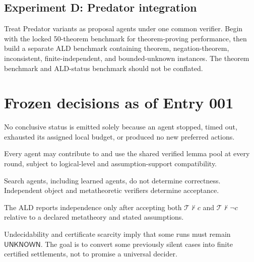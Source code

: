 \documentclass[11pt]{article}
\theoremstyle{definition}
\theoremstyle{remark}
\newcommand{\T}{\mathcal T}
\newcommand{\Unknown}{\mathsf{UNKNOWN}}
\begin{document}
\subsection{Experiment D: Predator integration}
Treat Predator variants as proposal agents under one common verifier. Begin with the locked 50-theorem benchmark for theorem-proving performance, then build a separate ALD benchmark containing theorem, negation-theorem, inconsistent, finite-independent, and bounded-unknown instances. The theorem benchmark and ALD-status benchmark should not be conflated.

\section{Frozen decisions as of Entry 001}

\begin{decisionbox}
No conclusive status is emitted solely because an agent stopped, timed out, exhausted its assigned local budget, or produced no new preferred actions.
\end{decisionbox}

\begin{decisionbox}
Every agent may contribute to and use the shared verified lemma pool at every round, subject to logical-level and assumption-support compatibility.
\end{decisionbox}

\begin{decisionbox}
Search agents, including learned agents, do not determine correctness. Independent object and metatheoretic verifiers determine acceptance.
\end{decisionbox}

\begin{decisionbox}
The ALD reports independence only after accepting both $\T\nvdash c$ and $\T\nvdash\neg c$ relative to a declared metatheory and stated assumptions.
\end{decisionbox}

\begin{decisionbox}
Undecidability and certificate scarcity imply that some runs must remain $\Unknown$. The goal is to convert some previously silent cases into finite certified settlements, not to promise a universal decider.
\end{decisionbox}
\end{document}
